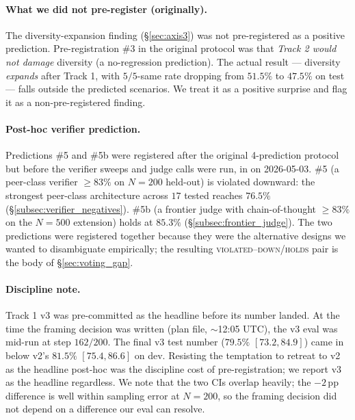 \paragraph{What we did not pre-register (originally).}
The diversity-expansion finding (\S\ref{sec:axis3}) was not
pre-registered as a positive prediction.  Pre-registration \#3 in
the original protocol was that \emph{Track 2 would not damage}
\cmaj{} diversity (a no-regression prediction).  The actual
result --- diversity \emph{expands} after Track 1, with $5/5$-same
rate dropping from $51.5\%$ to $47.5\%$ on test --- falls outside
the predicted scenarios.  We treat it as a positive surprise and
flag it as a non-pre-registered finding.

\paragraph{Post-hoc verifier prediction.}
Predictions \#5 and \#5b were registered after the original
4-prediction protocol but before the verifier sweeps and judge
calls were run, in
 on
2026-05-03.  \#5 (a peer-class verifier $\geq 83\%$ on $N{=}200$
held-out) is violated downward: the strongest peer-class
architecture across $17$ tested reaches $76.5\%$
(\S\ref{subsec:verifier_negatives}).  \#5b (a frontier judge with
chain-of-thought $\geq 83\%$ on the $N{=}500$ extension) holds
at $85.3\%$ (\S\ref{subsec:frontier_judge}).  The two predictions
were registered together because they were the alternative
designs we wanted to disambiguate empirically; the resulting
\textsc{violated--down}/\textsc{holds} pair is the body of
\S\ref{sec:voting_gap}.

\paragraph{Discipline note.}
Track 1 v3 was pre-committed as the headline before its \cmaj{}
number landed.  At the time the framing decision was written
(plan file, $\sim$12:05 UTC), the v3 \cmaj{} eval was mid-run at
step $162/200$.  The final v3 \cmaj{} test number ($79.5\%$
\mbox{$[73.2, 84.9]$}) came in below v2's $81.5\%$ \mbox{$[75.4,
86.6]$} on dev.  Resisting the temptation to retreat to v2 as the
headline post-hoc was the discipline cost of pre-registration; we
report v3 as the headline regardless.  We note that the two CIs
overlap heavily; the $-2$\,pp difference is well within sampling
error at $N{=}200$, so the framing decision did not depend on a
difference our eval can resolve.
